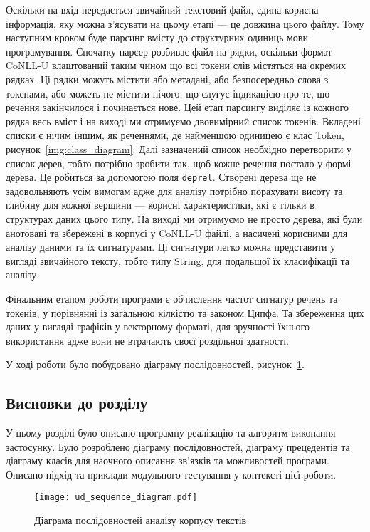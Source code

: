 Оскільки на вхід передається звичайний текстовий файл, єдина корисна інформація,
яку можна з'ясувати на цьому етапі --- це довжина цього файлу. Тому наступним кроком буде
парсинг вмісту до структурних одиниць мови програмування. Спочатку парсер розбиває
файл на рядки, оскільки формат CoNLL-U влаштований таким чином що всі токени слів
містяться на окремих рядках. Ці рядки можуть містити або метадані, або безпосередньо
слова з токенами, або можеть не містити нічого, що слугує індикацією про те, що
речення закінчилося і починається нове. Цей етап парсингу виділяє із кожного рядка
весь вміст і на виході ми отримуємо двовимірний список токенів. Вкладені
списки є нічим іншим, як реченнями, де найменшою одиницею є клас Token,
рисунок~\ref{img:class_diagram}. Далі зазначений список необхідно перетворити у список дерев,
тобто потрібно зробити так, щоб кожне речення постало у формі дерева.
Це робиться за допомогою поля \texttt{deprel}. Створені дерева ще не задовольняють
усім вимогам адже для аналізу потрібно порахувати висоту та глибину для кожної вершини --- 
корисні характеристики, які є тільки в структурах даних цього типу.
На виході ми отримуємо не просто дерева, які були анотовані та збережені в корпусі
у CoNLL-U файлі, а насичені корисними для аналізу даними та їх сигнатурами.
Ці сигнатури легко можна представити у вигляді звичайного тексту, тобто типу String, для
подальшої їх класифікації та аналізу.

Фінальним етапом роботи програми є обчислення частот сигнатур речень та токенів,
у порівнянні із загальною кілкістю та законом Ципфа. Та збереження цих даних
у вигляді графіків у векторному форматі, для зручності їхнього використання адже
вони не втрачають своєї роздільної здатності.

У ході роботи було побудовано діаграму послідовностей, рисунок~\ref{img:sequence_diagram}.

\subsection*{Висновки до розділу }
У цьому розділі було описано програмну реалізацію та алгоритм виконання
застосунку. Було розроблено діаграму послідовностей, діаграму прецедентів та
діаграму класів для наочного описання зв’язків та можливостей програми. Описано підхід та приклади модульного тестування у контексті цієї роботи.

\begin{figure}[H]
  \begin{center}
    \texttt{[image: ud\_sequence\_diagram.pdf]}
  \end{center}
  \caption{Діаграма послідовностей аналізу корпусу текстів}
  \label{img:sequence_diagram}
\end{figure}